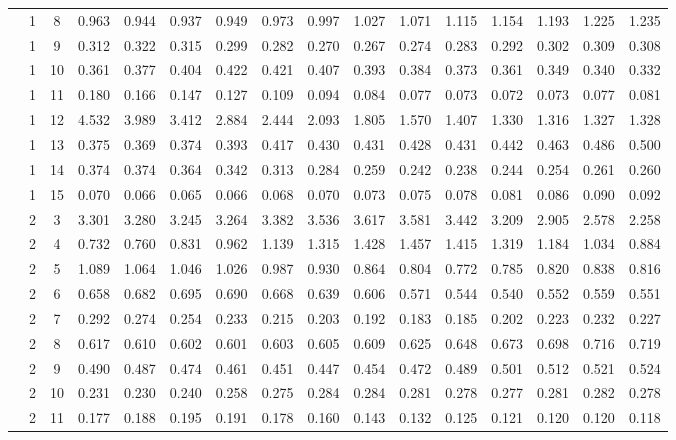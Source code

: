\documentclass[useAMS,usenatbib]{mn2e}
\begin{document}
\begin{longtable}{cccccccccccccccc}
 &  1 &  8 & 0.963 & 0.944 & 0.937 & 0.949 & 0.973 & 0.997 & 1.027 & 1.071 & 1.115 & 1.154 & 1.193 & 1.225 & 1.235 \\
 &  1 &  9 & 0.312 & 0.322 & 0.315 & 0.299 & 0.282 & 0.270 & 0.267 & 0.274 & 0.283 & 0.292 & 0.302 & 0.309 & 0.308 \\
 &  1 & 10 & 0.361 & 0.377 & 0.404 & 0.422 & 0.421 & 0.407 & 0.393 & 0.384 & 0.373 & 0.361 & 0.349 & 0.340 & 0.332 \\
 &  1 & 11 & 0.180 & 0.166 & 0.147 & 0.127 & 0.109 & 0.094 & 0.084 & 0.077 & 0.073 & 0.072 & 0.073 & 0.077 & 0.081 \\
 &  1 & 12 & 4.532 & 3.989 & 3.412 & 2.884 & 2.444 & 2.093 & 1.805 & 1.570 & 1.407 & 1.330 & 1.316 & 1.327 & 1.328 \\
 &  1 & 13 & 0.375 & 0.369 & 0.374 & 0.393 & 0.417 & 0.430 & 0.431 & 0.428 & 0.431 & 0.442 & 0.463 & 0.486 & 0.500 \\
 &  1 & 14 & 0.374 & 0.374 & 0.364 & 0.342 & 0.313 & 0.284 & 0.259 & 0.242 & 0.238 & 0.244 & 0.254 & 0.261 & 0.260 \\
 &  1 & 15 & 0.070 & 0.066 & 0.065 & 0.066 & 0.068 & 0.070 & 0.073 & 0.075 & 0.078 & 0.081 & 0.086 & 0.090 & 0.092 \\
 &  2 &  3 & 3.301 & 3.280 & 3.245 & 3.264 & 3.382 & 3.536 & 3.617 & 3.581 & 3.442 & 3.209 & 2.905 & 2.578 & 2.258 \\
 &  2 &  4 & 0.732 & 0.760 & 0.831 & 0.962 & 1.139 & 1.315 & 1.428 & 1.457 & 1.415 & 1.319 & 1.184 & 1.034 & 0.884 \\
 &  2 &  5 & 1.089 & 1.064 & 1.046 & 1.026 & 0.987 & 0.930 & 0.864 & 0.804 & 0.772 & 0.785 & 0.820 & 0.838 & 0.816 \\
 &  2 &  6 & 0.658 & 0.682 & 0.695 & 0.690 & 0.668 & 0.639 & 0.606 & 0.571 & 0.544 & 0.540 & 0.552 & 0.559 & 0.551 \\
 &  2 &  7 & 0.292 & 0.274 & 0.254 & 0.233 & 0.215 & 0.203 & 0.192 & 0.183 & 0.185 & 0.202 & 0.223 & 0.232 & 0.227 \\
 &  2 &  8 & 0.617 & 0.610 & 0.602 & 0.601 & 0.603 & 0.605 & 0.609 & 0.625 & 0.648 & 0.673 & 0.698 & 0.716 & 0.719 \\
 &  2 &  9 & 0.490 & 0.487 & 0.474 & 0.461 & 0.451 & 0.447 & 0.454 & 0.472 & 0.489 & 0.501 & 0.512 & 0.521 & 0.524 \\
 &  2 & 10 & 0.231 & 0.230 & 0.240 & 0.258 & 0.275 & 0.284 & 0.284 & 0.281 & 0.278 & 0.277 & 0.281 & 0.282 & 0.278 \\
 &  2 & 11 & 0.177 & 0.188 & 0.195 & 0.191 & 0.178 & 0.160 & 0.143 & 0.132 & 0.125 & 0.121 & 0.120 & 0.120 & 0.118 \\

\end{longtable}
\end{document}
